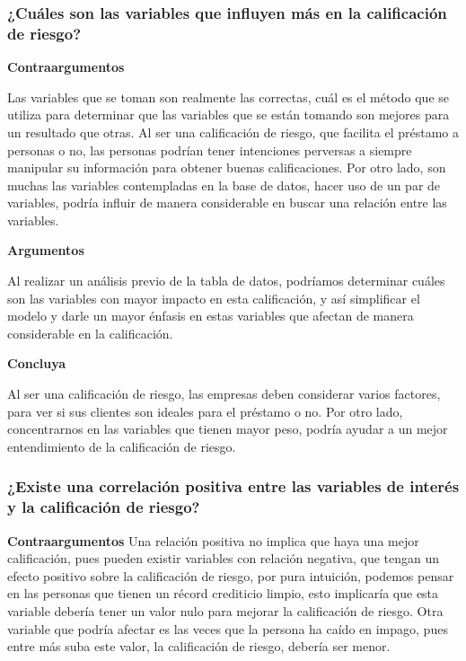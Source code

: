 \documentclass[
  letterpaper,
  DIV=11,
  numbers=noendperiod]{scrreprt}
\begin{document}
\subsubsection{¿Cuáles son las variables que influyen más en la
calificación de
riesgo?}\label{cuuxe1les-son-las-variables-que-influyen-muxe1s-en-la-calificaciuxf3n-de-riesgo}

\textbf{Contraargumentos}

Las variables que se toman son realmente las correctas, cuál es el
método que se utiliza para determinar que las variables que se están
tomando son mejores para un resultado que otras. Al ser una calificación
de riesgo, que facilita el préstamo a personas o no, las personas
podrían tener intenciones perversas a siempre manipular su información
para obtener buenas calificaciones. Por otro lado, son muchas las
variables contempladas en la base de datos, hacer uso de un par de
variables, podría influir de manera considerable en buscar una relación
entre las variables.

\textbf{Argumentos}

Al realizar un análisis previo de la tabla de datos, podríamos
determinar cuáles son las variables con mayor impacto en esta
calificación, y así simplificar el modelo y darle un mayor énfasis en
estas variables que afectan de manera considerable en la calificación.

\textbf{Concluya}

Al ser una calificación de riesgo, las empresas deben considerar varios
factores, para ver si sus clientes son ideales para el préstamo o no.
Por otro lado, concentrarnos en las variables que tienen mayor peso,
podría ayudar a un mejor entendimiento de la calificación de riesgo.

\subsubsection{¿Existe una correlación positiva entre las variables de
interés y la calificación de
riesgo?}\label{existe-una-correlaciuxf3n-positiva-entre-las-variables-de-interuxe9s-y-la-calificaciuxf3n-de-riesgo}

\textbf{Contraargumentos} Una relación positiva no implica que haya una
mejor calificación, pues pueden existir variables con relación negativa,
que tengan un efecto positivo sobre la calificación de riesgo, por pura
intuición, podemos pensar en las personas que tienen un récord
crediticio limpio, esto implicaría que esta variable debería tener un
valor nulo para mejorar la calificación de riesgo. Otra variable que
podría afectar es las veces que la persona ha caído en impago, pues
entre más suba este valor, la calificación de riesgo, debería ser menor.
\end{document}
